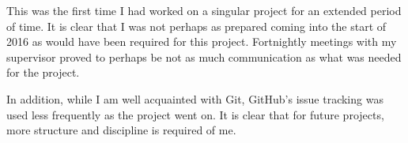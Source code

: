 \documentclass[report.tex]{subfiles}
\begin{document}
This was the first time I had worked on a singular project for an extended
period of time. It is clear that I was not perhaps as prepared coming into the
start of 2016 as would have been required for this project. Fortnightly meetings
with my supervisor proved to perhaps be not as much communication as what was
needed for the project.

In addition, while I am well acquainted with Git, GitHub's issue tracking was
used less frequently as the project went on. It is clear that for future
projects, more structure and discipline is required of me.

\newpage
\end{document}
